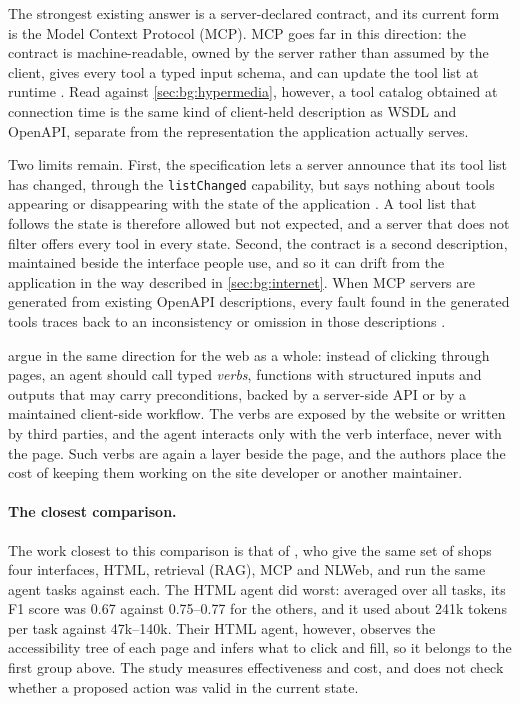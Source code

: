 The strongest existing answer is a server-declared contract, and its current form is the Model Context Protocol (MCP).
MCP goes far in this direction: the contract is machine-readable, owned by the server rather than assumed by the client, gives every tool a typed input schema, and can update the tool list at runtime \cite{mcpSpec2025}.
Read against \autoref{sec:bg:hypermedia}, however, a tool catalog obtained at connection time is the same kind of client-held description as WSDL and OpenAPI, separate from the representation the application actually serves.

Two limits remain.
First, the specification lets a server announce that its tool list has changed, through the \texttt{listChanged} capability, but says nothing about tools appearing or disappearing with the state of the application \cite{mcpSpec2025}.
A tool list that follows the state is therefore allowed but not expected, and a server that does not filter offers every tool in every state.
Second, the contract is a second description, maintained beside the interface people use, and so it can drift from the application in the way described in \autoref{sec:bg:internet}.
When MCP servers are generated from existing OpenAPI descriptions, every fault found in the generated tools traces back to an inconsistency or omission in those descriptions \cite{mastouri2026rest}.

\citet{jiang2026web} argue in the same direction for the web as a whole: instead of clicking through pages, an agent should call typed \emph{verbs}, functions with structured inputs and outputs that may carry preconditions, backed by a server-side API or by a maintained client-side workflow.
The verbs are exposed by the website or written by third parties, and the agent interacts only with the verb interface, never with the page.
Such verbs are again a layer beside the page, and the authors place the cost of keeping them working on the site developer or another maintainer.

\paragraph{The closest comparison.}
The work closest to this comparison is that of \citet{steiner2025mcp}, who give the same set of shops four interfaces, HTML, retrieval (RAG), MCP and NLWeb, and run the same agent tasks against each.
The HTML agent did worst: averaged over all tasks, its F1 score was 0.67 against 0.75--0.77 for the others, and it used about 241k tokens per task against 47k--140k.
Their HTML agent, however, observes the accessibility tree of each page and infers what to click and fill, so it belongs to the first group above.
The study measures effectiveness and cost, and does not check whether a proposed action was valid in the current state.

